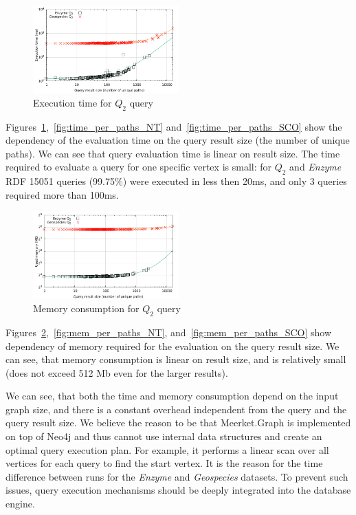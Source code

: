 \begin{figure}[ht]
  \begin{center}
    \includegraphics[width=0.5\textwidth]{data/time_per_paths_BT.pdf}
    \caption{Execution time for $Q_2$ query}
    \label{fig:time_per_paths_BT}
  \end{center}
\end{figure}

Figures~\ref{fig:time_per_paths_BT},~\ref{fig:time_per_paths_NT} and~\ref{fig:time_per_paths_SCO} show the dependency of the evaluation time on the query result size (the number of unique paths).
We can see that query evaluation time is linear on result size.
The time required to evaluate a query for one specific vertex is small: for $Q_2$ and \emph{Enzyme} RDF 15051 queries (99.75\%) were executed in less then 20ms, and only 3 queries required more than 100ms.

\begin{figure}[ht]
  \begin{center}
    \includegraphics[width=0.5\textwidth]{data/mem_per_paths_BT.pdf}
    \caption{Memory consumption for $Q_2$ query}
    \label{fig:mem_per_paths_BT}
  \end{center}
\end{figure}

Figures~\ref{fig:mem_per_paths_BT},~\ref{fig:mem_per_paths_NT}, and~\ref{fig:mem_per_paths_SCO} show dependency of memory required for the evaluation on the query result size.
We can see, that memory consumption is linear on result size, and is relatively small (does not exceed 512 Mb even for the larger results).

We can see, that both the time and memory consumption depend on the input graph size, and there is a constant overhead independent from the query and the query result size.
We believe the reason to be that Meerket.Graph is implemented on top of Neo4j and thus cannot use internal data structures and create an optimal query execution plan.
For example, it performs a linear scan over all vertices for each query to find the start vertex.
It is the reason for the time difference between runs for the \emph{Enzyme} and \emph{Geospecies} datasets.
To prevent such issues, query execution mechanisms should be deeply integrated into the database engine.

